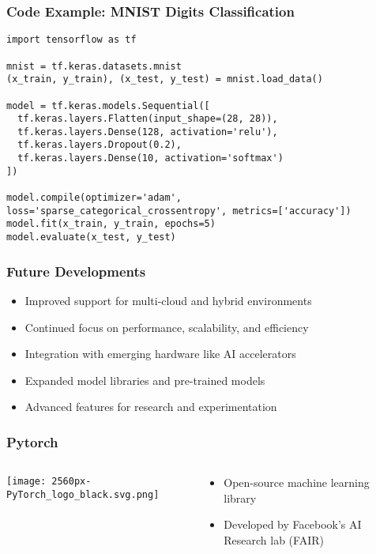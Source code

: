 \begin{frame}[fragile]\frametitle{Code Example: MNIST Digits Classification}
\begin{verbatim}
import tensorflow as tf

mnist = tf.keras.datasets.mnist
(x_train, y_train), (x_test, y_test) = mnist.load_data()

model = tf.keras.models.Sequential([
  tf.keras.layers.Flatten(input_shape=(28, 28)),
  tf.keras.layers.Dense(128, activation='relu'),
  tf.keras.layers.Dropout(0.2),
  tf.keras.layers.Dense(10, activation='softmax')
])

model.compile(optimizer='adam', loss='sparse_categorical_crossentropy', metrics=['accuracy'])
model.fit(x_train, y_train, epochs=5)
model.evaluate(x_test, y_test)
\end{verbatim}
\end{frame}

\begin{frame}[fragile]\frametitle{Future Developments}
\begin{itemize}
\item Improved support for multi-cloud and hybrid environments
\item Continued focus on performance, scalability, and efficiency
\item Integration with emerging hardware like AI accelerators
\item Expanded model libraries and pre-trained models
\item Advanced features for research and experimentation
\end{itemize}
\end{frame}

\begin{frame}[fragile]\frametitle{Pytorch}
\begin{columns}[T]
\begin{column}{.48\textwidth}
\texttt{[image: 2560px-PyTorch\_logo\_black.svg.png]}
\end{column}
\begin{column}{.48\textwidth}
\begin{itemize}
\item Open-source machine learning library
\item Developed by Facebook's AI Research lab (FAIR)
\end{itemize}
\end{column}
\end{columns}
\end{frame}

